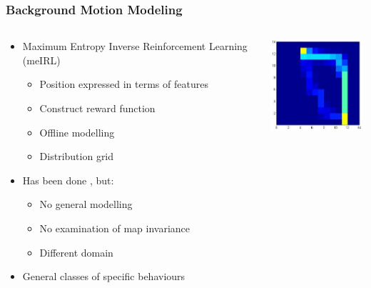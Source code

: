 \documentclass{beamer}
\begin{document}
\begin{frame}
    \frametitle{Background Motion Modeling}
    \begin{minipage}[0.5\textheight]{\textwidth}
        \begin{columns}[T]
            \begin{column}{0.7\textwidth}
                \begin{itemize}
        \item Maximum Entropy Inverse Reinforcement Learning (meIRL)
            \begin{itemize}
                \item Position expressed in terms of features
                \item Construct reward function 
                \item Offline modelling
                \item Distribution grid
            \end{itemize}
        \item Has been done \citep{6374144}, but:
            \begin{itemize}
                \item No general modelling
                \item No examination of map invariance
                \item Different domain
                    \end {itemize}
                \item  General classes of specific behaviours
                \end{itemize}
            \end{column}
            \begin{column}{1\textwidth}
                \includegraphics[width=4cm]{heat_map}
            \end{column}
        \end{columns}
    \end{minipage}
\end{frame}
\end{document}
